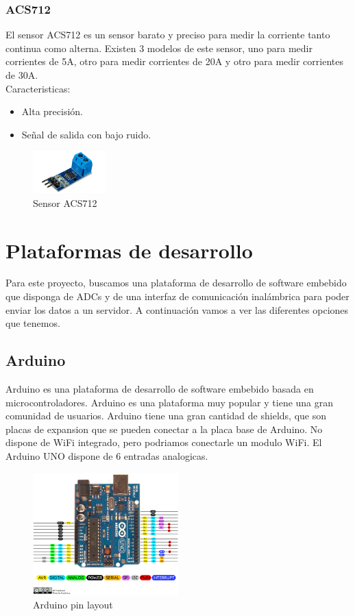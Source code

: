 \begin{titlepage}
\subsubsection{ACS712}
El sensor ACS712\cite{ref7} es un sensor barato y preciso para medir la corriente tanto continua como alterna. Existen 3 modelos de este sensor, uno para medir corrientes de 5A, otro para medir corrientes de 20A y otro para medir corrientes de 30A. \\

Caracteristicas:
\begin{itemize}
	\item Alta precisión.
	\item Señal de salida con bajo ruido.
\end{itemize}
\begin{figure}[h!]
	\centering
	\includegraphics[width=0.25\textwidth]{imagenes/acs712.png}
	\caption{Sensor ACS712\cite{acs712_img}}
\end{figure}

\section{Plataformas de desarrollo}
Para este proyecto, buscamos una plataforma de desarrollo de software embebido que disponga de ADCs y de una interfaz de comunicación inalámbrica para poder enviar los datos a un servidor. A continuación vamos a ver las diferentes opciones que tenemos. \\
\subsection{Arduino}
Arduino\cite{ref8} es una plataforma de desarrollo de software embebido basada en microcontroladores. Arduino es una plataforma muy popular y tiene una gran comunidad de usuarios. Arduino tiene una gran cantidad de shields, que son placas de expansion que se pueden conectar a la placa base de Arduino. No dispone de WiFi integrado, pero podriamos conectarle un modulo WiFi. El Arduino UNO dispone de 6 entradas analogicas. \\
\begin{figure}[h!]
	\centering
	\includegraphics[width=0.5\textwidth]{imagenes/arduino.png}
	\caption{Arduino pin layout\cite{arduino_img}}
\end{figure}

\end{titlepage}
